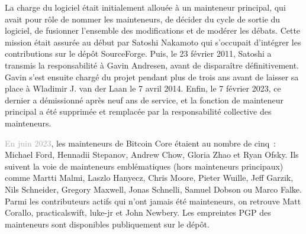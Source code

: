 La charge du logiciel était initialement allouée à un mainteneur principal, qui avait pour rôle de nommer les mainteneurs, de décider du cycle de sortie du logiciel, de fusionner l'ensemble des modifications et de modérer les débats. Cette mission était assurée au début par Satoshi Nakamoto qui s'occupait d'intégrer les contributions sur le dépôt SourceForge. Puis, le 23 février 2011, Satoshi a transmis la responsabilité à Gavin Andresen, avant de disparaître définitivement. Gavin s'est ensuite chargé du projet pendant plus de trois ans avant de laisser sa place à Wladimir J. van der Laan le 7 avril 2014. Enfin, le 7 février 2023, ce dernier a démissionné après neuf ans de service, et la fonction de mainteneur principal a été supprimée et remplacée par la responsabilité collective des mainteneurs.

\textcolor{darkgray}{En juin 2023}, les mainteneurs de Bitcoin Core étaient au nombre de cinq~: Michael Ford, Hennadii Stepanov, Andrew Chow, Gloria Zhao et Ryan Ofsky. Ils suivent la voie de mainteneurs emblématiques (hors mainteneurs principaux) comme Martti Malmi, Laszlo Hanyecz, Chris Moore, Pieter Wuille, Jeff Garzik, Nils Schneider, Gregory Maxwell, Jonas Schnelli, Samuel Dobson ou Marco Falke. Parmi les contributeurs actifs qui n'ont jamais été mainteneurs, on retrouve Matt Corallo, practicalswift, luke-jr et John Newbery.  Les empreintes PGP des mainteneurs sont disponibles publiquement sur le dépôt.

